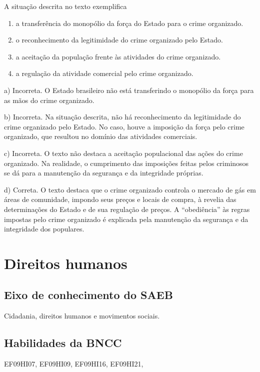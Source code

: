 A situação descrita no texto exemplifica

\begin{enumerate}
\def\labelenumi{\alph{enumi})}
\item
  a transferência do monopólio da força do Estado para o crime
  organizado.
\item
  o reconhecimento da legitimidade do crime organizado pelo Estado.
\item
  a aceitação da população frente às atividades do crime organizado.
\item
  a regulação da atividade comercial pelo crime organizado.
\end{enumerate}

a) Incorreta. O Estado brasileiro não está transferindo o monopólio da
força para as mãos do crime organizado.

b) Incorreta. Na situação descrita, não há reconhecimento da
legitimidade do crime organizado pelo Estado. No caso, houve a imposição
da força pelo crime organizado, que resultou no domínio das atividades
comerciais.

c) Incorreta. O texto não destaca a aceitação populacional das ações do
crime organizado. Na realidade, o cumprimento das imposições feitas
pelos criminosos se dá para a manutenção da segurança e da integridade
próprias.

d) Correta. O texto destaca que o crime organizado controla o mercado de
gás em áreas de comunidade, impondo seus preços e locais de compra, à
revelia das determinações do Estado e de sua regulação de preços. A
``obediência'' às regras impostas pelo crime organizado é explicada pela
manutenção da segurança e da integridade dos populares.

\chapter{Direitos humanos}

\section{Eixo de conhecimento do SAEB} Cidadania, direitos humanos e
movimentos sociais.

\section{Habilidades da BNCC} EF09HI07, EF09HI09, EF09HI16, EF09HI21,


